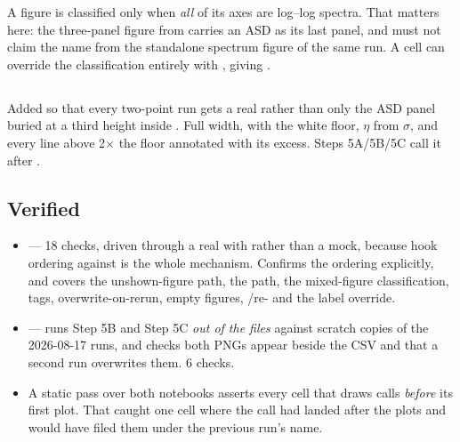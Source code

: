A figure is classified  only when \emph{all} of its axes are log--log
spectra. That matters here: the three-panel figure from
 carries an ASD as its last panel, and must not claim
the  name from the standalone spectrum figure of the same run. A cell can
override the classification entirely with , giving
.

\subsection{\texorpdfstring{}{spectrum\_figure()}}

Added so that every two-point run gets a real  rather than only the
ASD panel buried at a third height inside . Full width, with the
white floor, $\eta$ from $\sigma$, and every line above 2$\times$ the floor
annotated with its excess. Steps 5A/5B/5C call it after .

\subsection{Verified}

\begin{itemize}
  \item {} --- 18 checks, driven through a
        real  with  rather than a
        mock, because hook ordering against  is the whole
        mechanism. Confirms the ordering explicitly, and covers the unshown-figure
        path, the  path, the mixed-figure classification, tags,
        overwrite-on-rerun, empty figures, /re- and the
        label override.
  \item {} --- runs Step 5B and Step 5C
        \emph{out of the  files} against scratch copies of the
        2026-08-17 runs, and checks both PNGs appear beside the CSV and that a
        second run overwrites them. 6 checks.
  \item A static pass over both notebooks asserts every cell that draws calls
         \emph{before} its first plot. That caught one cell where the
        call had landed after the plots and would have filed them under the
        previous run's name.
\end{itemize}

